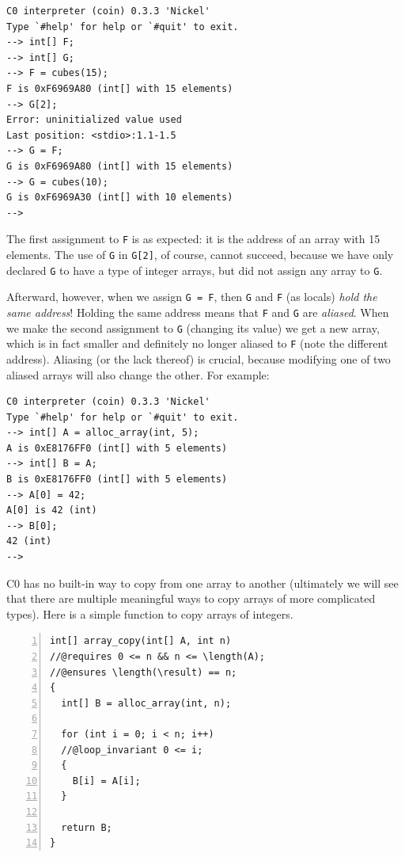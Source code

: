 \begin{lstlisting}[language={[coin]C}]
% coin -d cubes.c0
C0 interpreter (coin) 0.3.3 'Nickel'
Type `#help' for help or `#quit' to exit.
--> int[] F;
--> int[] G;
--> F = cubes(15);
F is 0xF6969A80 (int[] with 15 elements)
--> G[2];
Error: uninitialized value used
Last position: <stdio>:1.1-1.5
--> G = F;
G is 0xF6969A80 (int[] with 15 elements)
--> G = cubes(10);
G is 0xF6969A30 (int[] with 10 elements)
-->
\end{lstlisting}

The first assignment to \lstinline'F' is as expected: it is the
address of an array with 15 elements.  The use of \lstinline'G' in
\lstinline'G[2]', of course, cannot succeed, because we have only
declared \lstinline'G' to have a type of integer arrays, but did not
assign any array to \lstinline'G'.

Afterward, however, when we assign \lstinline'G = F', then
\lstinline'G' and \lstinline'F' (as locals) \emph{hold the same
  address}!  Holding the same address means that \lstinline'F' and
\lstinline'G' are \emph{aliased}.  When we make the second assignment
to \lstinline'G' (changing its value) we get a new array, which is in
fact smaller and definitely no longer aliased to \lstinline'F' (note
the different address).  Aliasing (or the lack thereof) is crucial,
because modifying one of two aliased arrays will also change the
other.  For example:

\begin{lstlisting}[language={[coin]C}]
% coin
C0 interpreter (coin) 0.3.3 'Nickel'
Type `#help' for help or `#quit' to exit.
--> int[] A = alloc_array(int, 5);
A is 0xE8176FF0 (int[] with 5 elements)
--> int[] B = A;
B is 0xE8176FF0 (int[] with 5 elements)
--> A[0] = 42;
A[0] is 42 (int)
--> B[0];
42 (int)
-->
\end{lstlisting}

C0 has no built-in way to copy from one array to another (ultimately
we will see that there are multiple meaningful ways to copy arrays of
more complicated types).  Here is a simple function to copy arrays of
integers.

%
\begin{lstlisting}[language={[C0]C}, numbers=left]
int[] array_copy(int[] A, int n)
//@requires 0 <= n && n <= \length(A);
//@ensures \length(\result) == n;
{
  int[] B = alloc_array(int, n);

  for (int i = 0; i < n; i++)
  //@loop_invariant 0 <= i;
  {
    B[i] = A[i];
  }

  return B;
}\end{lstlisting}

